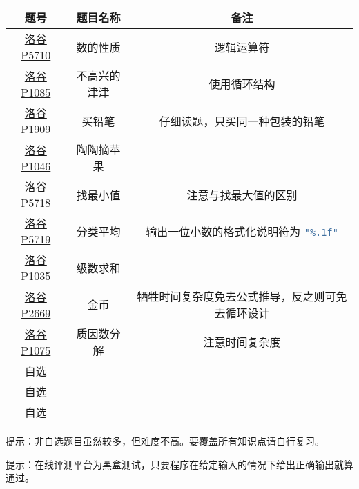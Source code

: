 \begin{problemset}
	\begin{table}[H]
		\centering
		\begin{tabular}{|c|c|c|}
			\hline
			题号 & 题目名称 & 备注
			\\\hline
			\href{https://www.luogu.com.cn/problem/P5710}{洛谷 P5710} & 数的性质 & 逻辑运算符
			\\\hline
			\href{https://www.luogu.com.cn/problem/P1085}{洛谷 P1085} & 不高兴的津津 & 使用循环结构
			\\\hline
			\href{https://www.luogu.com.cn/problem/P1909}{洛谷 P1909} & 买铅笔 & 仔细读题，只买同一种包装的铅笔
			\\\hline
			\href{https://www.luogu.com.cn/problem/P1046}{洛谷 P1046} & 陶陶摘苹果 &
			\\\hline
			\href{https://www.luogu.com.cn/problem/P5718}{洛谷 P5718} & 找最小值 & 注意与找最大值的区别
			\\\hline
			\href{https://www.luogu.com.cn/problem/P5719}{洛谷 P5719} & 分类平均 & 输出一位小数的格式化说明符为 \lstinline[language=c]$"%.1f"$
			\\\hline
			\href{https://www.luogu.com.cn/problem/P5720}{洛谷 P5720} & 一尺之棰 &
			\\\hline
			\href{https://www.luogu.com.cn/problem/P1980}{洛谷 P1980} & 计数问题 & \lstinline[language=c]$x % 10$ 即为 \lstinline$x$ 的个位
			\\\hline
			\href{https://www.luogu.com.cn/problem/P1035}{洛谷 P1035} & 级数求和 &
			\\\hline
			\href{https://www.luogu.com.cn/problem/P2669}{洛谷 P2669} & 金币 & 牺牲时间复杂度免去公式推导，反之则可免去循环设计
			\\\hline
			\href{https://www.luogu.com.cn/problem/P1075}{洛谷 P1075} & 质因数分解 & 注意时间复杂度
			\\\hline
			自选 & &
			\\\hline
			自选 & &
			\\\hline
			自选 & &
			\\\hline
		\end{tabular}
	\end{table}

	提示：非自选题目虽然较多，但难度不高。要覆盖所有知识点请自行复习。

	提示：在线评测平台为黑盒测试，只要程序在给定输入的情况下给出正确输出就算通过。

\end{problemset}
